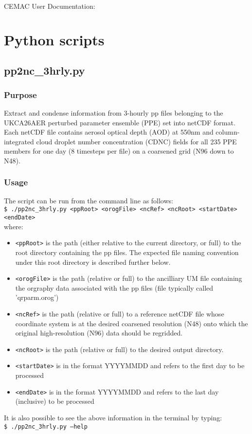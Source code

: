 \documentclass[10pt,a4paper]{article}
\newcommand\tab[1][0.5cm]{\hspace*{#1}}
\begin{document}
\begin{center}
\vspace*{0.5cm}
{\Huge CEMAC User Documentation: \Project}
\end{center}
\vspace*{0.5cm}

\section{Python scripts}

\subsection{pp2nc\_3hrly.py}

\subsubsection{Purpose}

Extract and condense information from 3-hourly pp files belonging to the UKCA26AER perturbed parameter ensemble (PPE) set into netCDF format. Each netCDF file contains aerosol optical depth (AOD) at 550nm and column-integrated cloud droplet number concentration (CDNC) fields for all 235 PPE members for one day (8 timesteps per file) on a coarsened grid (N96 down to N48).

\subsubsection{Usage}
The script can be run from the command line as follows:\\
\tab \texttt{\$ ./pp2nc\_3hrly.py <ppRoot> <orogFile> <ncRef> <ncRoot> <startDate> <endDate>}\\
where:
\begin{itemize}
\item \texttt{<ppRoot>} is the path (either relative to the current directory, or full) to the root directory containing the pp files. The expected file naming convention under this root directory is described further below.
\item \texttt{<orogFile>} is the path (relative or full) to the ancilliary UM file containing the orgraphy data associated with the pp files (file typically called 'qrparm.orog')
\item \texttt{<ncRef>} is the path (relative or full) to a reference netCDF file whose coordinate system is at the desired coarsened resolution (N48) onto which the original high-resolution (N96) data should be regridded.
\item \texttt{<ncRoot>} is the path (relative or full) to the desired output directory.
\item \texttt{<startDate>} is in the format YYYYMMDD and refers to the first day to be processed
\item \texttt{<endDate>} is in the format YYYYMMDD and refers to the last day (inclusive) to be processed 
\end{itemize}
It is also possible to see the above information in the terminal by typing:\\
\tab \texttt{\$ ./pp2nc\_3hrly.py --help}
\end{document}
